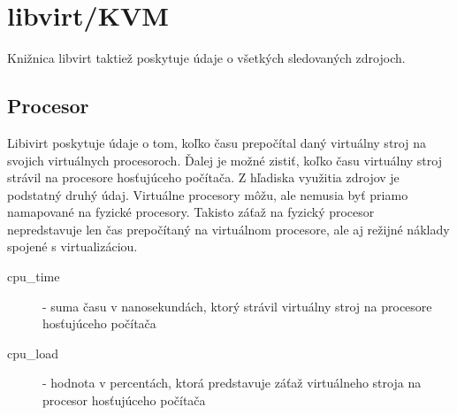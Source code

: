 \documentclass[printed,11pt,twoside,color,cover,table]{fithesis3}
\begin{document}
\section{libvirt/KVM}
Knižnica libvirt taktiež poskytuje údaje o všetkých sledovaných zdrojoch.

\subsection{Procesor}
Libivirt poskytuje údaje o tom, koľko času prepočítal daný virtuálny stroj na svojich virtuálnych procesoroch. Ďalej je možné zistiť, koľko času virtuálny stroj strávil na procesore hosťujúceho počítača. 
Z hľadiska využitia zdrojov je podstatný druhý údaj. Virtuálne procesory môžu, ale nemusia byť priamo namapované na fyzické procesory. Takisto záťaž na fyzický procesor nepredstavuje len čas prepočítaný
na virtuálnom procesore, ale aj režijné náklady spojené s virtualizáciou.

\begin{description}
\item[cpu\_time] - suma času v nanosekundách, ktorý strávil virtuálny stroj na procesore hosťujúceho počítača \cite{libvirt-cpu}
\item[cpu\_load] - hodnota v percentách, ktorá predstavuje záťaž virtuálneho stroja na procesor hosťujúceho počítača
\end{description}
\end{document}
